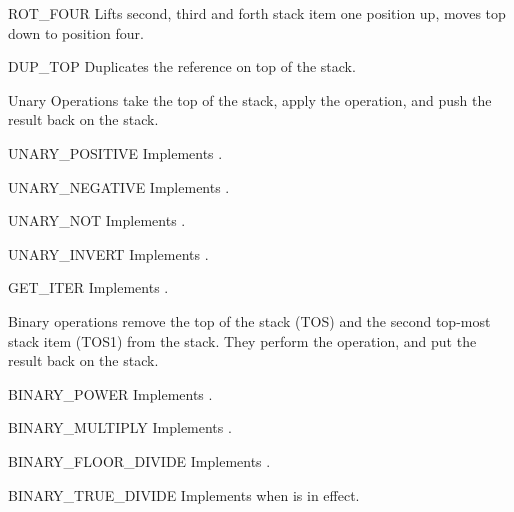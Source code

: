 \begin{opcodedesc}{ROT_FOUR}{}
Lifts second, third and forth stack item one position up, moves top down to
position four.
\end{opcodedesc}

\begin{opcodedesc}{DUP_TOP}{}
Duplicates the reference on top of the stack.
\end{opcodedesc}

Unary Operations take the top of the stack, apply the operation, and
push the result back on the stack.

\begin{opcodedesc}{UNARY_POSITIVE}{}
Implements .
\end{opcodedesc}

\begin{opcodedesc}{UNARY_NEGATIVE}{}
Implements .
\end{opcodedesc}

\begin{opcodedesc}{UNARY_NOT}{}
Implements .
\end{opcodedesc}

\begin{opcodedesc}{UNARY_INVERT}{}
Implements .
\end{opcodedesc}

\begin{opcodedesc}{GET_ITER}{}
Implements .
\end{opcodedesc}

Binary operations remove the top of the stack (TOS) and the second top-most
stack item (TOS1) from the stack.  They perform the operation, and put the
result back on the stack.

\begin{opcodedesc}{BINARY_POWER}{}
Implements .
\end{opcodedesc}

\begin{opcodedesc}{BINARY_MULTIPLY}{}
Implements .
\end{opcodedesc}

\begin{opcodedesc}{BINARY_FLOOR_DIVIDE}{}
Implements .
\end{opcodedesc}

\begin{opcodedesc}{BINARY_TRUE_DIVIDE}{}
Implements  when
 is in effect.
\end{opcodedesc}


